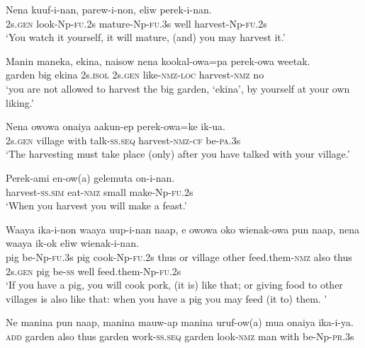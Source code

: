 \ea
\gll  Nena  kuuf-i-nan,  parew-i-non,  eliw  perek-i-nan. \\
2s.\textsc{gen}  look-Np-\textsc{fu}.2s  mature-Np-\textsc{fu}.3s  well  harvest-Np-\textsc{fu}.2s \\
\glt ‘You watch it yourself, it will mature, (and) you may harvest it.’ \\
\z


\ea
\gll  Manin  maneka,  ekina,  naisow  nena  kookal-owa=pa  perek-owa{\footnotemark}   weetak. \\
garden  big  ekina  2s.\textsc{isol}  2s.\textsc{gen}  like-\textsc{nmz}-\textsc{loc}  harvest-\textsc{nmz}  no \\
\glt ‘you are not allowed to harvest the big garden, ‘ekina’, by yourself at  your own liking.’ \\
\z


\ea
\gll  Nena  owowa  onaiya  aakun-ep  perek-owa=ke  ik-ua. \\
2s.\textsc{gen}  village  with  talk-\textsc{ss.seq}  harvest-\textsc{nmz}-\textsc{cf}  be-\textsc{pa}.3s \\
\glt ‘The harvesting must take place (only) after you have talked with your village.’ \\
\z


\ea
\gll  Perek-ami  en-ow(a)  gelemuta  on-i-nan. \\
harvest-\textsc{ss}.\textsc{sim}  eat-\textsc{nmz}  small  make-Np-\textsc{fu}.2s \\
\glt ‘When you harvest you will make a feast.’ \\
\z


\ea
\gll  Waaya  ika-i-non  waaya  uup-i-nan  naap,  e  owowa  oko   wienak-owa  pun  naap,  nena  waaya  ik-ok  eliw  wienak-i-nan. \\
pig  be-Np-\textsc{fu}.3s  pig  cook-Np-\textsc{fu}.2s  thus  or  village  other   feed.them-\textsc{nmz}  also  thus  2s.\textsc{gen}  pig  be-\textsc{ss}  well  feed.them-Np-\textsc{fu}.2s \\


\glt ‘If you have a pig, you will cook pork, (it is) like that; or giving food to other villages is also like that: when you have a pig you may feed (it to) them. ’ \\
\z


\ea
\gll  Ne  manina  pun  naap,  manina  mauw-ap  manina  uruf-ow(a)  mua onaiya  ika-i-ya. \\
\textsc{add}  garden  also  thus  garden  work-\textsc{ss.seq}  garden  look-\textsc{nmz}  man    with  be-Np-\textsc{pr}.3s \\


